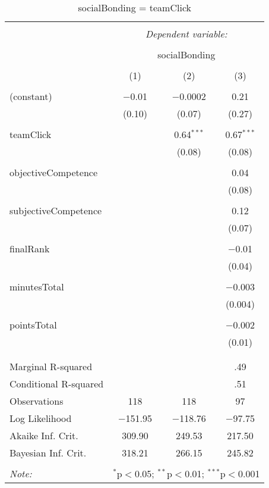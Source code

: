 
\begin{table}[!htbp] \centering 
  \caption{socialBonding = teamClick} 
  \label{tab:MLM2aTeamClickBonding} 
\begin{tabular}{@{\extracolsep{5pt}}lccc} 
\\[-1.8ex]\hline 
\hline \\[-1.8ex] 
 & \multicolumn{3}{c}{\textit{Dependent variable:}} \\ 
\cline{2-4} 
\\[-1.8ex] & \multicolumn{3}{c}{socialBonding} \\ 
\\[-1.8ex] & (1) & (2) & (3)\\ 
\hline \\[-1.8ex] 
 (constant) & $-$0.01 & $-$0.0002 & 0.21 \\ 
  & (0.10) & (0.07) & (0.27) \\ 
  & & & \\ 
 teamClick &  & 0.64$^{***}$ & 0.67$^{***}$ \\ 
  &  & (0.08) & (0.08) \\ 
  & & & \\ 
 objectiveCompetence &  &  & 0.04 \\ 
  &  &  & (0.08) \\ 
  & & & \\ 
 subjectiveCompetence &  &  & 0.12 \\ 
  &  &  & (0.07) \\ 
  & & & \\ 
 finalRank &  &  & $-$0.01 \\ 
  &  &  & (0.04) \\ 
  & & & \\ 
 minutesTotal &  &  & $-$0.003 \\ 
  &  &  & (0.004) \\ 
  & & & \\ 
 pointsTotal &  &  & $-$0.002 \\ 
  &  &  & (0.01) \\ 
  & & & \\ 
\hline \\[-1.8ex] 
Marginal R-squared &  &  & .49 \\ 
Conditional R-squared &  &  & .51 \\ 
Observations & 118 & 118 & 97 \\ 
Log Likelihood & $-$151.95 & $-$118.76 & $-$97.75 \\ 
Akaike Inf. Crit. & 309.90 & 249.53 & 217.50 \\ 
Bayesian Inf. Crit. & 318.21 & 266.15 & 245.82 \\ 
\hline 
\hline \\[-1.8ex] 
\textit{Note:}  & \multicolumn{3}{r}{$^{*}$p$<$0.05; $^{**}$p$<$0.01; $^{***}$p$<$0.001} \\ 
\end{tabular} 
\end{table} 
